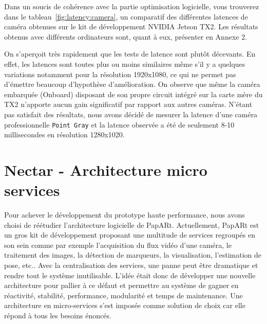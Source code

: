 Dans un soucis de cohérence avec la partie optimisation logicielle, vous trouverez dans le tableau~\ref{fig:latency:camera}, un comparatif des différentes latences de caméra obtenues sur le kit de développement NVIDIA Jetson TX2. Les résultats obtenus avec différents ordinateurs sont, quant à eux, présenter en Annexe 2.

\begin{table}[H]
\centering
\caption{Latence (en ms) de plusieurs caméras mesurée en Glass to glass - NVIDIA Jetson TX2}
\label{fig:latency:camera}
\end{table}

On s'aperçoit très rapidement que les tests de latence sont plutôt décevants. En effet, les latences sont toutes plus ou moins similaires même s'il y a quelques variations notamment pour la résolution 1920x1080, ce qui ne permet pas d'émettre beaucoup d'hypothèse d'amélioration. On observe que même la caméra embarquée (Onboard) disposant de son propre circuit intégré sur la carte mère du TX2 n'apporte aucun gain significatif par rapport aux autres caméras.
N'étant pas satisfait des résultats, nous avons décidé de mesurer la latence d'une caméra professionnelle \texttt{Point Gray} et la latence observée a été de seulement 8-10 millisecondes en résolution 1280x1020.

\newpage
\section{Nectar - Architecture micro services}
\label{sec:nectararchi}

Pour achever le développement du prototype haute performance, nous avons choisi de réétudier l'architecture logicielle de PapARt. 
Actuellement, PapARt est un gros kit de développement proposant une multitude de services regroupés en son sein comme par exemple l'acquisition du flux vidéo d'une caméra, le traitement des images, la détection de marqueurs, la visualisation, l'estimation de pose, etc.. Avec la centralisation des services, une panne peut être dramatique et rendre tout le système inutilisable. L'idée était donc de développer une nouvelle architecture pour pallier à ce défaut et permettre au système de gagner en réactivité, stabilité, performance, modularité et temps de maintenance. Une architecture en micro-services s'est imposée comme solution de choix car elle répond à tous les besoins énoncés.

